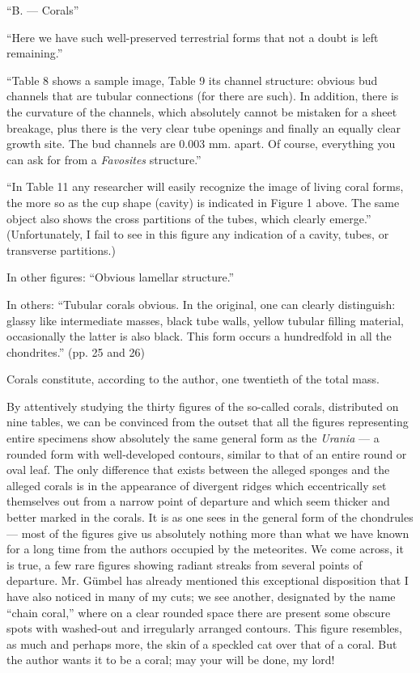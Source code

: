 \documentclass[a4paper, 12pt, oneside]{article}
\begin{document}
``B. --- Corals''

``Here we have such well-preserved terrestrial forms that not a doubt is left remaining.''

``Table 8 shows a sample image, Table 9 its channel structure: obvious bud channels that are tubular connections (for there are such). In addition, there is the curvature of the channels, which absolutely cannot be mistaken for a sheet breakage, plus there is the very clear tube openings and finally an equally clear growth site. The bud channels are 0.003 mm. apart. Of course, everything you can ask for from a \emph{Favosites} structure.''

``In Table 11 any researcher will easily recognize the image of living coral forms, the more so as the cup shape (cavity) is indicated in Figure 1 above. The same object also shows the cross partitions of the tubes, which clearly emerge.'' (Unfortunately, I fail to see in this figure any indication of a cavity, tubes, or transverse partitions.)

In other figures: ``Obvious lamellar structure.''

In others: ``Tubular corals obvious. In the original, one can clearly distinguish: glassy like intermediate masses, black tube walls, yellow tubular filling material, occasionally the latter is also black. This form occurs a hundredfold in all the chondrites.'' (pp. 25 and 26)

Corals constitute, according to the author, one twentieth of the total mass.

By attentively studying the thirty figures of the so-called corals, distributed on nine tables, we can be convinced from the outset that all the figures representing entire specimens show absolutely the same general form as the \emph{Urania} --- a rounded form with well-developed contours, similar to that of an entire round or oval leaf. The only difference that exists between the alleged sponges and the alleged corals is in the appearance of divergent ridges which eccentrically set themselves out from a narrow point of departure and which seem thicker and better marked in the corals. It is as one sees in the general form of the chondrules --- most of the figures give us absolutely nothing more than what we have known for a long time from the authors occupied by the meteorites. We come across, it is true, a few rare figures showing radiant streaks from several points of departure. Mr. Gümbel has already mentioned this exceptional disposition that I have also noticed in many of my cuts; we see another, designated by the name ``chain coral,'' where on a clear rounded space there are present some obscure spots with washed-out and irregularly arranged contours. This figure resembles, as much and perhaps more, the skin of a speckled cat over that of a coral. But the author wants it to be a coral; may your will be done, my lord!
\end{document}
